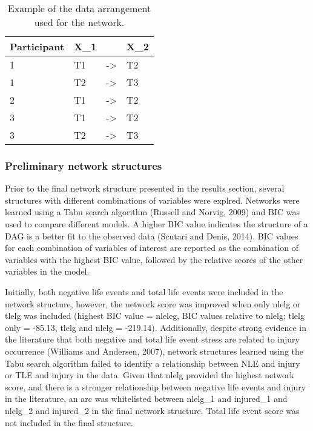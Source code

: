 \documentclass[utf8]{frontiersHLTH}
\begin{document}
\begin{table}[H]

\caption{\label{tab:table2}Example of the data arrangement used for the network.}
\centering
\begin{tabular}[t]{l|l|l|l}
\hline
\textbf{Participant} & \textbf{X\_1} & \textbf{ } & \textbf{X\_2}\\
\hline
1 & T1 & -> & T2\\
\hline
1 & T2 & -> & T3\\
\hline
2 & T1 & -> & T2\\
\hline
3 & T1 & -> & T2\\
\hline
3 & T2 & -> & T3\\
\hline
\end{tabular}
\end{table}

\hypertarget{preliminary-network-structures}{%
\subsubsection*{Preliminary network
structures}\label{preliminary-network-structures}}

Prior to the final network structure presented in the results section,
several structures with different combinations of variables were
explred. Networks were learned using a Tabu search algorithm (Russell
and Norvig, 2009) and BIC was used to compare different models. A higher
BIC value indicates the structure of a DAG is a better fit to the
observed data (Scutari and Denis, 2014). BIC values for each combination
of variables of interest are reported as the combination of variables
with the highest BIC value, followed by the relative scores of the other
variables in the model.

Initially, both negative life events and total life events were included
in the network structure, however, the network score was improved when
only nlelg or tlelg was included (highest BIC value = nleleg, BIC values
relative to nlelg; tlelg only = -85.13, tlelg and nlelg = -219.14).
Additionally, despite strong evidence in the literature that both
negative and total life event stress are related to injury occurrence
(Williams and Andersen, 2007), network structures learned using the Tabu
search algorithm failed to identify a relationship between NLE and
injury or TLE and injury in the data. Given that nlelg provided the
highest network score, and there is a stronger relationship between
negative life events and injury in the literature, an arc was
whitelisted between nlelg\_1 and injured\_1 and nlelg\_2 and injured\_2
in the final network structure. Total life event score was not included
in the final structure.
\end{document}

